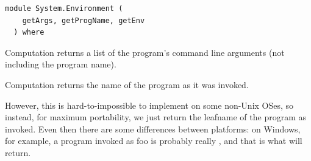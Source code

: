 \label{module:System.Environment}
\haddockbeginheader
{\haddockverb\begin{verbatim}
module System.Environment (
    getArgs, getProgName, getEnv
  ) where\end{verbatim}}
\haddockendheader

\begin{haddockdesc}
\item[\begin{tabular}{@{}l}
getArgs :: IO {\char 91}String{\char 93}
\end{tabular}]
{\haddockbegindoc
Computation  returns a list of the program's command
 line arguments (not including the program name).\par}
\end{haddockdesc}
\begin{haddockdesc}
\item[\begin{tabular}{@{}l}
getProgName :: IO String
\end{tabular}]
{\haddockbegindoc
Computation  returns the name of the program as it was
invoked.\par
However, this is hard-to-impossible to implement on some non-Unix
OSes, so instead, for maximum portability, we just return the leafname
of the program as invoked. Even then there are some differences
between platforms: on Windows, for example, a program invoked as foo
is probably really , and that is what  will return.\par}
\end{haddockdesc}
